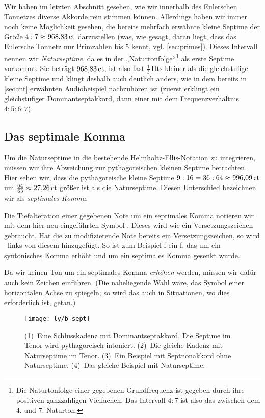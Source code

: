 Wir haben im letzten Abschnitt gesehen, wie wir innerhalb des Eulerschen
Tonnetzes diverse Akkorde rein stimmen können.  Allerdings haben wir immer noch
keine Möglichkeit gesehen, die bereits mehrfach erwähnte kleine Septime der
Größe $4:7\approx 968{,}83\,\mathrm{ct}$ darzustellen (was, wie gesagt, daran liegt,
dass das Eulersche Tonnetz nur Primzahlen bis $5$ kennt,
vgl. \cref{sec:primes}). Dieses Intervall nennen wir \emph{Naturseptime}, da es
in der „Naturtonfolge“\footnote{Die Naturtonfolge einer gegebenen Grundfrequenz
  ist gegeben durch ihre positiven ganzzahligen Vielfachen. Das Intervall $4:7$
  ist also das zwischen dem $4$. und $7$. Naturton.} als erste Septime vorkommt.
Sie beträgt $968{,}83\,\mathrm{ct}$, ist also fast $\frac13\,\text{Hts}$ kleiner als
die gleichstufige kleine Septime und klingt deshalb auch deutlich anders, wie in
dem bereits in \cref{sec:int} erwähnten Audiobeispiel nachzuhören ist
(zuerst erklingt ein gleichstufiger Dominantseptakkord, dann einer mit dem
Frequenzverhältnis $4:5:6:7$).

\subsection{Das septimale Komma}

Um die Naturseptime in die bestehende Helmholtz-Ellis-Notation zu integrieren,
müssen wir ihre Abweichung zur pythagoreischen kleinen Septime betrachten.  Hier
sehen wir, dass die pythagoreische kleine Septime
$9:16=36:64\approx 996{,}09\,\mathrm{ct}$ um $\frac{64}{63}\approx 27{,}26\,\mathrm{ct}$
größer ist als die Naturseptime. Diesen Unterschied bezeichnen wir als
\emph{septimales Komma}.

Die Tiefalteration einer gegebenen Note um ein septimales Komma notieren wir mit
dem hier neu eingeführten Symbol \septimal.  Dieses wird wie ein
Versetzungszeichen gebraucht. Hat die zu modifizierende Note bereits ein
Versetzungszeichen, so wird \septimal\ links von diesem hinzugefügt. So ist zum
Beispiel \septimal\naturalp f ein f, das um ein syntonisches Komma erhöht und um
ein septimales Komma gesenkt wurde.

Da wir keinen Ton um ein septimales Komma \emph{erhöhen} werden, müssen wir
dafür auch kein Zeichen einführen. (Die naheliegende Wahl wäre, das Symbol einer
horizontalen Achse zu spiegeln; so wird das auch in Situationen, wo dies
erforderlich ist, getan.)

\begin{figure}
  \centering
  \texttt{[image: ly/b-sept]}
  \caption{(1)~Eine Schlusskadenz mit Dominantseptakkord. Die Septime im
    Tenor wird pythagoreisch intoniert.
    \quad(2)~Die gleiche Kadenz mit Naturseptime im Tenor.
    \quad(3)~Ein Beispiel mit Septnonakkord ohne Naturseptime.
    \quad(4)~Das gleiche Beispiel mit Naturseptime.}\label{fig:sept}
\end{figure}

